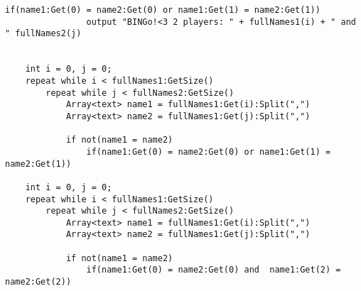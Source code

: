 \begin{lstlisting}[language=Quorum,tabsize=2]
			if(name1:Get(0) = name2:Get(0) or name1:Get(1) = name2:Get(1)) 
				output "BINGo!<3 2 players: " + fullNames1(i) + " and " fullNames2(j)
				
			
	int i = 0, j = 0; 
	repeat while i < fullNames1:GetSize()
		repeat while j < fullNames2:GetSize()
			Array<text> name1 = fullNames1:Get(i):Split(",")
			Array<text> name2 = fullNames1:Get(j):Split(",")
			
			if not(name1 = name2)
				if(name1:Get(0) = name2:Get(0) or name1:Get(1) = name2:Get(1))
				
	int i = 0, j = 0; 
	repeat while i < fullNames1:GetSize()
		repeat while j < fullNames2:GetSize()
			Array<text> name1 = fullNames1:Get(i):Split(",")
			Array<text> name2 = fullNames1:Get(j):Split(",")
			
			if not(name1 = name2)
				if(name1:Get(0) = name2:Get(0) and  name1:Get(2) = name2:Get(2))
\end{lstlisting}